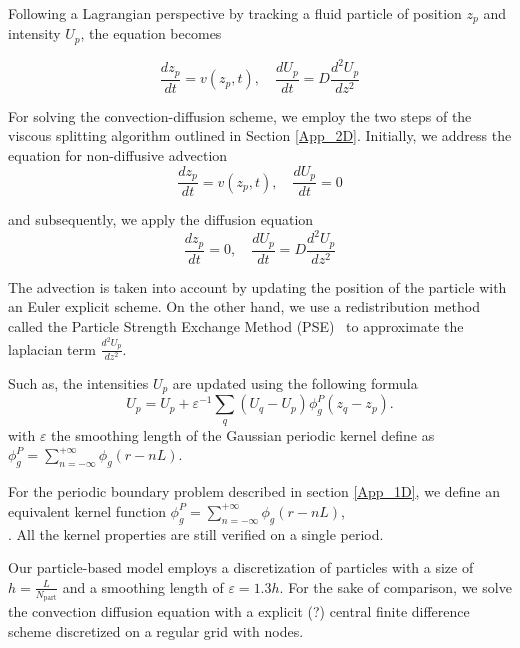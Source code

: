 Following a Lagrangian perspective by tracking a fluid particle of position $z_p$ and intensity $U_p$, the equation becomes

\begin{equation*}
	\frac{dz_p}{dt} = v(z_p, t), \quad \frac{dU_p}{dt} = D \frac{d^2 U_p}{dz^2}
\end{equation*}

For solving the convection-diffusion scheme, we employ the two steps of the viscous splitting algorithm outlined in Section \ref{App_2D}. Initially, we address the equation for non-diffusive advection
\begin{equation*}
	\frac{dz_p}{dt} = v(z_p, t), \quad \frac{dU_p}{dt} = 0
\end{equation*}

and subsequently, we apply the diffusion equation
\begin{equation*}
	\frac{dz_p}{dt} = 0, \quad \frac{dU_p}{dt} = D \frac{d^2 U_p}{dz^2}
\end{equation*}

The advection is taken into account by updating the position of the particle with an Euler explicit scheme. %
On the other hand, we use a redistribution method called the Particle Strength Exchange Method (PSE)~\cite{degond_1989,cottet_1990} to approximate the laplacian term $\frac{d^2 U_p}{dz^2}$.

Such as, the intensities $U_p$ are updated using the following formula
\begin{equation*}
	U_p = U_p + \varepsilon^{-1} \sum_{q} (U_q - U_p) \phi_g^P(z_q - z_p).
\end{equation*}with $\varepsilon$ the smoothing length of the Gaussian periodic kernel define as $ \phi^P_g = \sum_{n=-\infty}^{+\infty} \phi_g(r - n L)$.

For the periodic boundary problem described in section \ref{App_1D}, we define an equivalent kernel function $\phi^P_g = \sum_{n=-\infty}^{+\infty} \phi_g(r - n L)$, \\ . All the kernel properties are still verified on a single period.

Our particle-based model employs a discretization of \npart{} particles with a size of $h = \frac{L}{N_{\text{part}}}$ and a smoothing length of $\varepsilon = 1.3 h$.
For the sake of comparison, we solve the convection diffusion equation with a explicit (?) central finite difference scheme discretized on a regular grid with \ngrid{} nodes.

